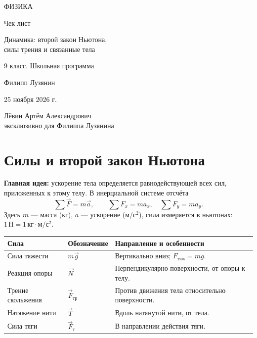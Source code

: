 \documentclass[a4paper,12pt]{article}
\newcommand{\unit}[1]{\,\text{#1}}
\begin{document}
\begin{titlepage}
\centering\thispagestyle{empty}
\vspace*{28mm}
{\Large\color{darkaccent} ФИЗИКА\par}
\vspace{16mm}
{\huge Чек-лист\par}
\vspace{12mm}
{\LARGE\color{accent} Динамика: второй закон Ньютона,\\ силы трения и связанные тела\par}
\vspace{18mm}
{\large 9 класс. Школьная программа\par}
\vfill
{\large Филипп Лузянин\par}
\vspace{12mm}
25 ноября 2026 г.\par
\vspace{19mm}
{\small Лёвин Артём Александрович\\ эксклюзивно для Филиппа Лузянина\par}
\vspace{18mm}
\vspace{5mm}
\end{titlepage}
\setcounter{page}{1}
\section{Силы и второй закон Ньютона}
\textbf{Главная идея:} ускорение тела определяется равнодействующей всех сил, приложенных к этому телу. В инерциальной системе отсчёта
\[\sum\vec F=m\vec a,\qquad \sum F_x=ma_x,\quad \sum F_y=ma_y.\]
Здесь $m$ --- масса (кг), $a$ --- ускорение (м/с$^2$), сила измеряется в ньютонах: $1\unit{Н}=1\unit{кг}\cdot\text{м}/\text{с}^2$.
\begin{center}
\renewcommand{\arraystretch}{1.3}
\begin{tabularx}{\linewidth}{@{}l l X@{}}\toprule
Сила & Обозначение & Направление и особенности\\\midrule
Сила тяжести & $m\vec g$ & Вертикально вниз; $F_{\text{тяж}}=mg$.\\
Реакция опоры & $\vec N$ & Перпендикулярно поверхности, от опоры к телу.\\
Трение скольжения & $\vec F_{\text{тр}}$ & Против движения тела относительно поверхности.\\
Натяжение нити & $\vec T$ & Вдоль натянутой нити, от тела.\\
Сила тяги & $\vec F_{\text{т}}$ & В направлении действия тяги.\\\bottomrule
\end{tabularx}
\end{center}
\end{document}

